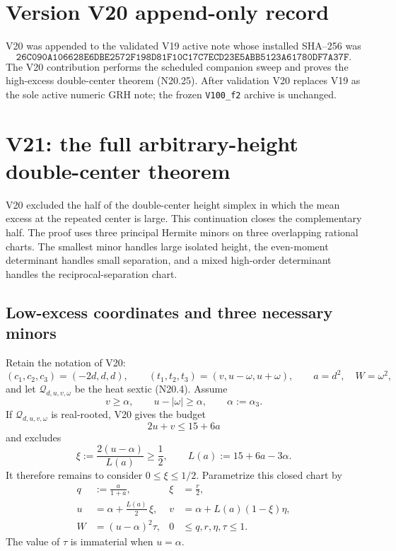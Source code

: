 \documentclass[11pt]{article}
\theoremstyle{definition}
\theoremstyle{remark}
\begin{document}
\section*{Version V20 append-only record}

V20 was appended to the validated V19 active note whose installed SHA--256
was
\[
\texttt{26C090A106628E6DBE2572F198D81F10C17C7ECD23E5ABB5123A61780DF7A37F}.
\tag{N20.33}
\]
The V20 contribution performs the scheduled companion sweep and proves the
high-excess double-center theorem \textup{(N20.25)}.  After validation V20
replaces V19 as the sole active numeric GRH note; the frozen
\texttt{V100\_f2} archive is unchanged.



\section{V21: the full arbitrary-height double-center theorem}
\label{sec:f2v21-double-center-complete}

V20 excluded the half of the double-center height simplex in which the
mean excess at the repeated center is large.  This continuation closes the
complementary half.  The proof uses three principal Hermite minors on three
overlapping rational charts.  The smallest minor handles large isolated
height, the even-moment determinant handles small separation, and a
mixed high-order determinant handles the reciprocal-separation chart.

\subsection{Low-excess coordinates and three necessary minors}
\label{subsec:f2v21-coordinates}

Retain the notation of V20:
\[
 (c_1,c_2,c_3)=(-2d,d,d),\qquad
 (t_1,t_2,t_3)=(v,u-\omega,u+\omega),
 \qquad a=d^2,\quad W=\omega^2,
 \tag{N21.1}
\]
and let \(\mathcal Q_{d,u,v,\omega}\) be the heat sextic
\textup{(N20.4)}.  Assume
\[
 v\geq\alpha,\qquad u-|\omega|\geq\alpha,
 \qquad \alpha:=\alpha_3.
 \tag{N21.2}
\]
If \(\mathcal Q_{d,u,v,\omega}\) is real-rooted, V20 gives the budget
\[
 2u+v\leq15+6a
 \tag{N21.3}
\]
and excludes
\[
 \xi:=\frac{2(u-\alpha)}{L(a)}\geq\frac12,
 \qquad L(a):=15+6a-3\alpha.
 \tag{N21.4}
\]
It therefore remains to consider \(0\leq\xi\leq1/2\).  Parametrize this
closed chart by
\[
\begin{aligned}
 q&:=\frac{a}{1+a},&
 \xi&=\frac r2,\\
 u&=\alpha+\frac{L(a)}2\,\xi,&
 v&=\alpha+L(a)(1-\xi)\eta,\\
 W&=(u-\alpha)^2\tau,&
 0&\leq q,r,\eta,\tau\leq1.
\end{aligned}
\tag{N21.5}
\]
The value of \(\tau\) is immaterial when \(u=\alpha\).
\end{document}
